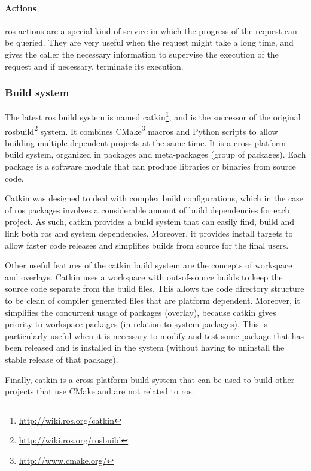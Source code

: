 \paragraph{Actions}

\gls{ros} actions are a special kind of service in which the progress of the request can be queried. They are very useful when the request might take a long time, and gives the caller the necessary information to supervise the execution of the request and if necessary, terminate its execution.


\subsubsection{Build system}

The latest \gls{ros} build system is named catkin\footnote{\url{http://wiki.ros.org/catkin}}, and is the successor of the original rosbuild\footnote{\url{http://wiki.ros.org/rosbuild}} system. It combines CMake\footnote{\url{http://www.cmake.org/}} macros and Python scripts to allow building multiple dependent projects at the same time. It is a cross-platform build system, organized in packages and meta-packages (group of packages). Each package is a software module that can produce libraries or binaries from source code.

Catkin was designed to deal with complex build configurations, which in the case of \gls{ros} packages involves a considerable amount of build dependencies for each project. As such, catkin provides a build system that can easily find, build and link both \gls{ros} and system dependencies. Moreover, it provides install targets to allow faster code releases and simplifies builds from source for the final users.

Other useful features of the catkin build system are the concepts of workspace and overlays. Catkin uses a workspace with out-of-source builds to keep the source code separate from the build files. This allows the code directory structure to be clean of compiler generated files that are platform dependent. Moreover, it simplifies the concurrent usage of packages (overlay), because catkin gives priority to workspace packages (in relation to system packages). This is particularly useful when it is necessary to modify and test some package that has been released and is installed in the system (without having to uninstall the stable release of that package).

Finally, catkin is a cross-platform build system that can be used to build other projects that use CMake and are not related to \gls{ros}.


